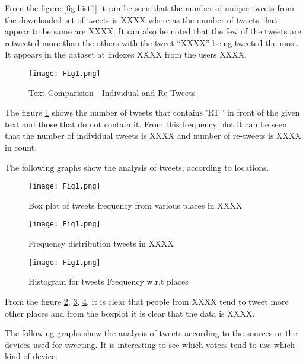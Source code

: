 \documentclass[a4paper,12pt, notitlepage]{article}
\begin{document}
\par
From the figure \ref{fig:hist1} it can be seen that the number of unique tweets from the
downloaded set of tweets is XXXX where as the number of tweets that appear to be same are XXXX. It can also be noted that the few of the tweets are retweeted more than the others with the tweet ``XXXX'' being tweeted the most. It appears in the dataset at indexes XXXX from the users XXXX.

\begin{figure}[!htbp]
    \centering
    \texttt{[image: Fig1.png]}
    \caption{Text Comparision - Individual and Re-Tweets}
    \label{fig:vbarplot1}
\end{figure}

\par
The figure \ref{fig:vbarplot1} shows the number of tweets that contains 'RT ' in front of the given text and those that do not contain it. From this frequency plot it can be seen
that the number of individual tweets is XXXX and number of re-tweets is XXXX in count.

\par
The following graphs show the analysis of tweets, according to locations.

\begin{figure}[!htbp]
    \centering
    \texttt{[image: Fig1.png]}
    \caption{Box plot of tweets frequency from various places in XXXX }
    \label{fig:boxplot1}
\end{figure}

\begin{figure}[!htbp]
    \centering
    \texttt{[image: Fig1.png]}
    \caption{Frequency distribution tweets in XXXX }
    \label{fig:vbarplot2}
\end{figure}

\begin{figure}[!htbp]
    \centering
    \texttt{[image: Fig1.png]}
    \caption{Histogram for tweets Frequency w.r.t places}
    \label{fig:hist2}
\end{figure}

\par
From the figure \ref{fig:boxplot1}, \ref{fig:vbarplot2}, \ref{fig:hist2}, it is clear that people from XXXX tend to tweet more other places and from the boxplot it is clear that the data is XXXX.

\par
The following graphs show the analysis of tweets according to the sources or the devices used for tweeting. It is interesting to see which voters tend to use which kind of device.
\end{document}
